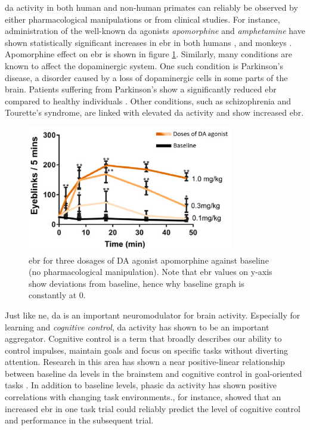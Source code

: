 \acrshort{da} activity in both human and non-human primates can reliably be observed by either pharmacological manipulations or from clinical studies. For instance, administration of the well-known \acrshort{da} agonists \textit{apomorphine} and \textit{amphetamine} have shown statistically significant increases in \acrshort{ebr} in both humans \cite{blin1990, strakowski1998, strakowski1996}, and monkeys \cite{redmond2011, kotani2016}. Apomorphine effect on \acrshort{ebr} is shown in figure \ref{fig:bt_da_corr}. Similarly, many conditions are known to affect the dopaminergic system. One such condition is Parkinson's disease, a disorder caused by a loss of dopaminergic cells in some parts of the brain. Patients suffering from Parkinson's show a significantly reduced \acrshort{ebr} compared to healthy individuals \cite{bologna2012}. Other conditions, such as schizophrenia and Tourette's syndrome, are linked with elevated \acrshort{da} activity and show increased \acrshort{ebr}. 

\begin{figure}[h]
    \centering
    \includegraphics[width=0.8\textwidth]{figures/bt_DA_correlation.png}
    \caption{\acrlong{ebr} for three dosages of DA agonist apomorphine against baseline (no pharmacological manipulation). Note that \acrshort{ebr} values on y-axis show deviations from baseline, hence why baseline graph is constantly at 0.}
    \label{fig:bt_da_corr}
\end{figure}

Just like \acrshort{ne}, \acrshort{da} is an important neuromodulator for brain activity. Especially for learning and \textit{cognitive control}, \acrshort{da} activity has shown to be an important aggregator. Cognitive control is a term that broadly describes our ability to control impulses, maintain goals and focus on specific tasks without diverting attention. Research in this area has shown a near positive-linear relationship between baseline \acrshort{da} levels in the brainstem and cognitive control in goal-oriented tasks \cite{puig2014, westbrook2016}. In addition to baseline levels, phasic \acrshort{da} activity has shown positive correlations with changing task environments.\textcite{bochove2012}, for instance, showed that an increased \acrshort{ebr} in one task trial could reliably predict the level of cognitive control and performance in the subsequent trial.

